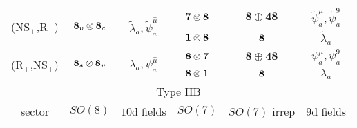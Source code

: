 {\begin{tabular}{|cccccc|}
    \multicolumn{1}{|c|}{\multirow{2}{*}{(NS$_+$,R$_-$)}}  & \multicolumn{1}{c|}{\multirow{2}{*}{$\boldsymbol{8_v} \otimes \boldsymbol{8_c}$}} & \multicolumn{1}{c|}{\multirow{2}{*}{$\tilde{\lambda}_a, \tilde{\psi}^{\hat{\mu}}_a$}}      & \multicolumn{1}{c|}{$\boldsymbol{7} \otimes \boldsymbol{8}$}                          & \multicolumn{1}{c|}{$\boldsymbol{8} \oplus\boldsymbol{48}$}                           & $\tilde{\psi}^\mu_a, \tilde{\psi}^9_a$ \\ \cline{4-6} 
    \multicolumn{1}{|c|}{}                                 & \multicolumn{1}{c|}{}                                 & \multicolumn{1}{c|}{}                                                                    & \multicolumn{1}{c|}{$\boldsymbol{1} \otimes \boldsymbol{8}$}                              & \multicolumn{1}{c|}{$\boldsymbol{8}$}                                                         & $\tilde{\lambda}_a$                  \\ \hline
    \multicolumn{1}{|c|}{\multirow{2}{*}{(R$_+$,NS$_+$)}}  & \multicolumn{1}{c|}{\multirow{2}{*}{$\boldsymbol{8_s}\otimes\boldsymbol{8_v}$}}   & \multicolumn{1}{c|}{\multirow{2}{*}{${\lambda}_a, {\psi}^{\hat{\mu}}_a$}}                  & \multicolumn{1}{c|}{$\boldsymbol{8}\otimes\boldsymbol{7}$}                            & \multicolumn{1}{c|}{$\boldsymbol{8} \oplus\boldsymbol{48}$}                           & $\psi^\mu_a, \psi^9_a$                 \\ \cline{4-6} 
    \multicolumn{1}{|c|}{}                                 & \multicolumn{1}{c|}{}                                 & \multicolumn{1}{c|}{}                                                                    & \multicolumn{1}{c|}{$\boldsymbol{8} \otimes \boldsymbol{1}$}                              & \multicolumn{1}{c|}{$\boldsymbol{8}$}                                                         & $\lambda_a$                          \\ \hline
    \multicolumn{6}{|c|}{Type IIB}                                                                                                                                                                                                                                                                                                                                                                                   \\ \hline
    \multicolumn{1}{|c|}{sector}                           & \multicolumn{1}{c|}{$SO(8)$}                          & \multicolumn{1}{c|}{$10$d fields}                                                        & \multicolumn{1}{c|}{$SO(7)$}                                          & \multicolumn{1}{c|}{$SO(7)$ irrep}                                                    & $9$d fields                          \\ \hline

\end{tabular}}

